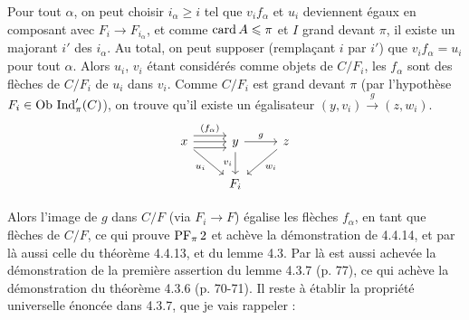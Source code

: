 Pour tout $\alpha$, on peut choisir $i_\alpha\geqslant i$ tel que $v_if_\alpha$ et $u_i$ deviennent égaux en composant avec $F_i\longrightarrow F_{i_\alpha}$, et comme $\operatorname{card} A\leqslant\pi$ et $I$ grand devant $\pi$, il existe un majorant $i'$ des $i_\alpha$. Au total, on peut supposer (remplaçant $i$ par $i'$) que $v_if_\alpha=u_i$ pour tout $\alpha$. Alors $u_i$, $v_i$ étant considérés comme objets de $C/F_i$, les $f_\alpha$ sont des flèches de $C/F_i$ de $u_i$ dans $v_i$. Comme $C/F_i$ est grand devant $\pi$ (par l'hypothèse $F_i\in\mathrm{Ob}\,\operatorname{Ind}'_\pi(C)$), on trouve qu'il existe un égalisateur $(y,v_i)\xrightarrow{\;g\;}(z,w_i)$.
\[
\begin{tikzcd}
x \arrow[r, shift left=2, "(f_\alpha)"] \arrow[r] \arrow[r, shift right=2] \arrow[dr, "u_i"'] & y \arrow[r, "g"] \arrow[d, "v_i"'] & z \arrow[dl, "w_i"] \\
& F_i &
\end{tikzcd}
\]

Alors l'image de $g$ dans $C/F$ (via $F_i\longrightarrow F$) égalise les flèches $f_\alpha$, en tant que flèches de $C/F$, ce qui prouve $\mathrm{PF}_\pi\,2$ et achève la démonstration de 4.4.14, et par là aussi celle du théorème 4.4.13, et du lemme 4.3. Par là est aussi achevée la démonstration de la première assertion du lemme
4.3.7 (p. 77), ce qui achève la démonstration du théorème 4.3.6 (p. 70-71). Il reste à établir la propriété universelle énoncée dans 4.3.7, que je vais rappeler :

